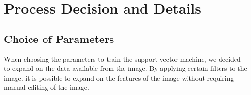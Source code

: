 \chapter{Process Decision and Details}

\section{Choice of Parameters}

When choosing the parameters to train the support vector machine, we decided to expand on the data available from the image. By applying certain filters to the image, it is possible to expand on the features of the image without requiring manual editing of the image.

